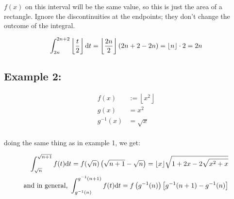 \documentclass[12pt]{article}
\begin{document}
		$f(x)$ on this interval will be the same value, so this is just the area of a rectangle.
		Ignore the discontinuities at the endpoints; they don't change the outcome of the integral.

		\begin{align*}
			\int_{2n}^{2n+2}\left\lfloor\frac t2\right\rfloor\text dt
			= \left\lfloor\frac{2n}2\right\rfloor(2n+2-2n)
			= \lfloor n\rfloor\cdot2 = 2n
		\end{align*}

	\subsection*{Example 2:}

		\begin{minipage}{0.5\textwidth}
			\begin{align*}
				f(x) & := \left\lfloor x^2\right\rfloor\\
				g(x) & = x^2\\
				g^{-1}(x) & = \sqrt x\\
			\end{align*}
		\end{minipage}
		\hfill
		\begin{minipage}{0.5\textwidth}
		\end{minipage}

		doing the same thing as in example 1, we get:

		\begin{align*}
			\int_{\sqrt n}^{\sqrt{n+1}}f(t)\text dt = f(\sqrt n)\left(\sqrt{n+1}-\sqrt n\right)
			= \lfloor x\rfloor\sqrt{1+2x-2\sqrt{x^2+x}}\\
			\text{and in general, }\int_{g^{-1}(n)}^{g^{-1}(n+1)}f(t)\text dt
			=f\left(g^{-1}(n)\right)\left[g^{-1}(n+1)-g^{-1}(n)\right]
		\end{align*}
\end{document}
